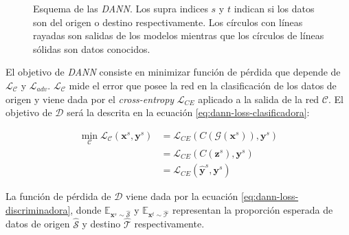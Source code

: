 \begin{figure}[H]

    \caption[Esquema de {\it DANN}]{Esquema de las {\it DANN}. Los supra indices $s$ y $t$ indican si los datos son del origen o destino respectivamente.
        Los círculos con líneas rayadas son salidas de los modelos mientras que los círculos de líneas sólidas son datos conocidos.}
    \label{fig:dann-esquema}
\end{figure}

El objetivo de {\it DANN} consiste en minimizar función de pérdida que depende de $\mathcal{L}_\mathcal{C}$ y
$\mathcal{L}_{adv}$. $\mathcal{L}_\mathcal{C}$ mide el error que posee la red en la clasificación de los datos de
origen y viene dada por el {\it cross-entropy} $\mathcal{L}_{CE}$ aplicado a la salida de la red $\mathcal{C}$. El
objetivo de $\mathcal{D}$ será la descrita en la ecuación \ref{eq:dann-loss-clasificadora}:

\begin{align}
    \min_{\mathcal{C}} \mathcal{L}_\mathcal{C}(\mathbf{x}^s, \mathbf{y}^s) & = \mathcal{L}_{CE}(C(\mathcal{G}(\mathbf{x}^s)), \mathbf{y}^s) \nonumber \\
                                                                           & = \mathcal{L}_{CE}(C(\mathbf{z}^s), \mathbf{y}^s) \nonumber              \\
                                                                           & = \mathcal{L}_{CE}(\hat{\mathbf{y}}^s, \mathbf{y}^s)
    \label{eq:dann-loss-clasificadora}
\end{align}

La función de pérdida de $\mathcal{D}$ viene dada por la ecuación \ref{eq:dann-loss-discriminadora}, donde
$\mathbb{E}_{\mathbf{x}^s \sim \mathcal{\hat{S}}}$ y $\mathbb{E}_{\mathbf{x}^t \sim \mathcal{\hat{T}}}$ representan la
proporción esperada de datos de origen $\mathcal{\hat{S}}$ y destino $\mathcal{\hat{T}}$ respectivamente.

